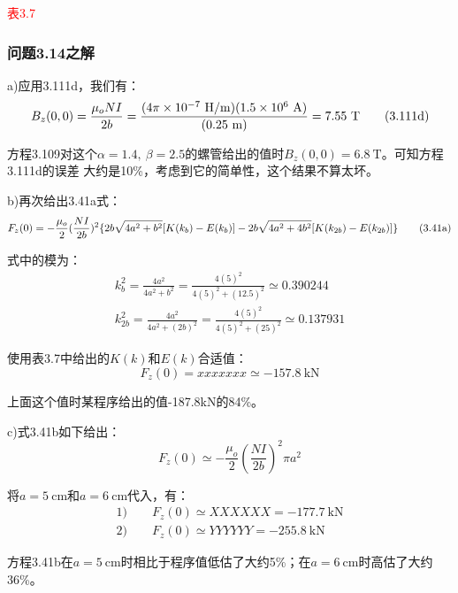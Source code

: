 \textcolor{red}{表3.7}

\subsubsection{问题3.14之解}
a)应用3.111d，我们有：
\begin{equation*}
B_{z}(0,0)=\frac{\mu_{o}NI}{2b}\\%
=\frac{(4\pi\times 10^{-7}\ \mathrm{H/m})(1.5\times 10^{6}\ \mathrm{A})}{(0.25\ \mathrm{m})}=7.55\ \mathrm{T}\tag{3.111d}
\end{equation*}

方程3.109对这个$\alpha=1.4,\ \beta=2.5$的螺管给出的值时$B_z(0,0) = 6.8\ \mathrm{T}$。可知方程3.111d的误差
大约是10\%，考虑到它的简单性，这个结果不算太坏。

b)再次给出3.41a式：
\begin{equation*}
F_{z}(0)=-\frac{\mu_{o}}{2}(\frac{NI}{2b})^{2}\{2b\sqrt{4a^{2}+b^{2}}[K(k_{b})-E(k_{b})]\\
-2b\sqrt{4a^{2}+4b^{2}}[K(k_{2b})-E(k_{2b})]\}\tag{3.41a}%
\end{equation*}

式中的模为：
\begin{eqnarray*}
k_b^2=\frac{4a^2}{4a^2+b^2}=\frac{4(5)^2}{4(5)^2+(12.5)^2}\simeq 0.390244\\
k_{2b}^2=\frac{4a^2}{4a^2+(2b)^2}=\frac{4(5)^2}{4(5)^2+(25)^2}\simeq 0.137931
\end{eqnarray*}

使用表3.7中给出的$K(k)$和$E(k)$合适值：
\begin{equation*}
F_z(0)= xxxxxxx \simeq -157.8\ \mathrm{kN}
\end{equation*}

上面这个值时某程序给出的值-187.8kN的84\%。

c)式3.41b如下给出：
\begin{equation*}
F_{z}(0)\simeq-\frac{\mu_{o}}{2}(\frac{NI}{2b})^{2}\pi a^{2}\tag{3.41b}%
\end{equation*}

将$a=5\ \mathrm{cm}$和$a=6\ \mathrm{cm}$代入，有：
\begin{eqnarray*}
1)\qquad F_z(0)\simeq XXXXXX =-177.7\ \mathrm{kN}\\
2)\qquad F_z(0)\simeq YYYYYY = -255.8\ \mathrm{kN}
\end{eqnarray*}

方程3.41b在$a=5\ \mathrm{cm}$时相比于程序值低估了大约5\%；在$a=6 \ \mathrm{cm}$时高估了大约36\%。

